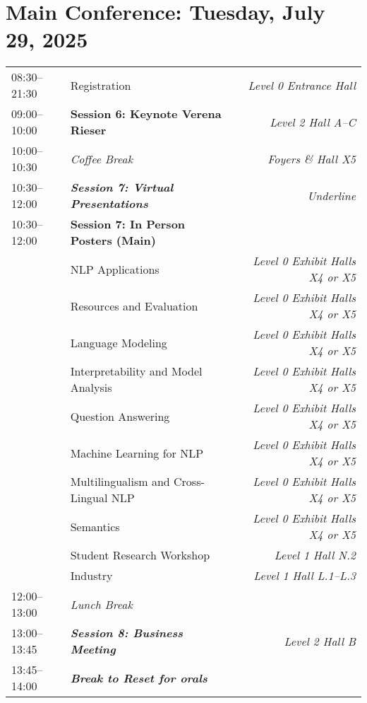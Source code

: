 \section{Main Conference: Tuesday, July 29, 2025}

\begin{xltabular}{\linewidth}{l X r}
    08:30--21:30    &   Registration    &   \textit{Level 0 Entrance Hall} \\
    09:00--10:00    &   \textbf{Session 6: Keynote Verena Rieser}    &   \textit{Level 2 Hall A--C} \\
    10:00--10:30    &   \textit{Coffee Break}    & \textit{Foyers \& Hall X5}  \\
    10:30--12:00    &   \textit{\textbf{Session 7: Virtual Presentations}}    & \textit{Underline}  \\
    10:30--12:00    &   \textbf{Session 7: In Person Posters (Main)} & \\
    &   NLP Applications  & \textit{Level 0 Exhibit Halls X4 or X5} \\
    &   Resources and Evaluation  & \textit{Level 0 Exhibit Halls X4 or X5} \\
    &   Language Modeling  & \textit{Level 0 Exhibit Halls X4 or X5} \\
    &   Interpretability and Model Analysis   & \textit{Level 0 Exhibit Halls X4 or X5} \\
    &   Question Answering  & \textit{Level 0 Exhibit Halls X4 or X5} \\
    &   Machine Learning for NLP  & \textit{Level 0 Exhibit Halls X4 or X5} \\
    &   Multilingualism and Cross-Lingual NLP  & \textit{Level 0 Exhibit Halls X4 or X5} \\
    &   Semantics  & \textit{Level 0 Exhibit Halls X4 or X5} \\
    &   Student Research Workshop  & \textit{Level 1 Hall N.2} \\
    &   Industry  & \textit{Level 1 Hall L.1--L.3} \\

    12:00--13:00    &   \textit{Lunch Break}  & \\

    13:00--13:45    &   \textit{\textbf{Session 8: Business Meeting}}  & \textit{Level 2 Hall B}\\

    13:45--14:00    &   \textit{\textbf{Break to Reset for orals}}  & \\


\end{xltabular}
